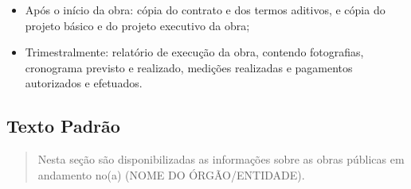 \documentclass[
]{book}
\providecommand{\tightlist}{%
  \setlength{\itemsep}{0pt}\setlength{\parskip}{0pt}}
\begin{document}
\begin{itemize}
\tightlist
\item
  Após o início da obra: cópia do contrato e dos termos aditivos, e cópia do projeto básico e do projeto executivo da obra;
\item
  Trimestralmente: relatório de execução da obra, contendo fotografias, cronograma previsto e realizado, medições realizadas e pagamentos autorizados e efetuados.
\end{itemize}

\hypertarget{texto-padruxe3o-4}{%
\subsection{Texto Padrão}\label{texto-padruxe3o-4}}

\begin{quote}
Nesta seção são disponibilizadas as informações sobre as obras públicas em andamento no(a) (NOME DO ÓRGÃO/ENTIDADE).
\end{quote}
\end{document}
